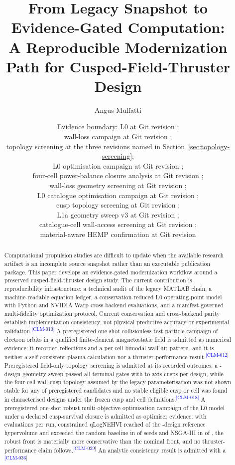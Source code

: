 \documentclass[11pt]{article}
\title{From Legacy Snapshot to Evidence-Gated Computation:\\
A Reproducible Modernization Path for Cusped-Field-Thruster Design}
\author{Angus Muffatti}
\date{Evidence boundary: L0 at Git revision \EvidenceRevision;\\
wall-loss campaign at Git revision \WallLossEvidenceRevision;\\
topology screening at the three revisions named in Section~\ref{sec:topology-screening};\\
L0 optimisation campaign at Git revision \MdoEvidenceRevision;\\
four-cell power-balance closure analysis at Git revision \ClosureEvidenceRevision;\\
wall-loss geometry screening at Git revision \GeometryScreeningEvidenceRevision;\\
L0 catalogue optimisation campaign at Git revision \MdbEvidenceRevision;\\
cusp topology screening at Git revision \CuspTopologyEvidenceRevision;\\
L1a geometry sweep v3 at Git revision \SweepThreeEvidenceRevision;\\
catalogue-cell wall-access screening at Git revision \GeometryScreeningTwoEvidenceRevision;\\
material-aware HEMP confirmation at Git revision \HempConfirmationEvidenceRevision}
\newcommand{\EvidenceClaim}[2]{#2\textsuperscript{\textcolor{blue}{[#1]}}}
\begin{document}
\maketitle

\begin{abstract}
Computational propulsion studies are difficult to update when the available
research artifact is an incomplete source snapshot rather than an executable
publication package. This paper develops an evidence-gated modernization
workflow around a preserved cusped-field-thruster design study. The current
contribution is reproducibility infrastructure: a technical audit of the
legacy MATLAB chain, a machine-readable equation ledger, a conservation-reduced
L0 operating-point model with Python and NVIDIA Warp cross-backend evaluations,
and a manifest-governed multi-fidelity optimization protocol.
\EvidenceClaim{CLM-010}{Current conservation and cross-backend parity establish
implementation consistency, not physical predictive accuracy or experimental
validation.}
\EvidenceClaim{CLM-012}{A preregistered one-shot collisionless test-particle
campaign of \WlfPooledTrials{} electron orbits in a qualified finite-element
magnetostatic field is admitted as numerical evidence: it recorded
\WlfPooledReflected{} reflections and a per-cell bimodal wall-hit pattern, and it
is neither a self-consistent plasma calculation nor a thruster-performance
result.}
\EvidenceClaim{CLM-018}{Preregistered field-only topology screening is admitted
at its recorded outcomes: a \SwpEvaluated-design geometry sweep passed all
\SwpGateCount{} terminal gates with \SwpCuspLow{} to \SwpCuspHigh{} axis cusps per
design, while the four-cell wall-cusp topology assumed by the legacy
parameterisation was not shown stable for any of \FcnEvaluated{} preregistered
candidates and no stable eligible cusp or cell was found in \TchEvaluated{}
characterised designs under the frozen cusp and cell definitions.}
\EvidenceClaim{CLM-029}{A preregistered one-shot robust multi-objective
optimisation campaign of the L0 model under a declared cusp-survival closure is
admitted as optimiser evidence: with \MdoEvaluationsPerRun{} evaluations per run,
constrained qLogNEHVI reached \MdoAttainedBoMeanTwo{} of the
\MdoDenseCount-design reference hypervolume and exceeded the random baseline in
\MdoBoBeatsRandomWins{} of \MdoBoBeatsRandomSeeds{} seeds and NSGA-III in
\MdoBoBeatsNsgaWins{} of \MdoBoBeatsNsgaSeeds, the robust front is materially
more conservative than the nominal front, and no thruster-performance claim
follows.}
\EvidenceClaim{CLM-036}{An analytic consistency result is admitted with a
}
\end{abstract}
\end{document}
